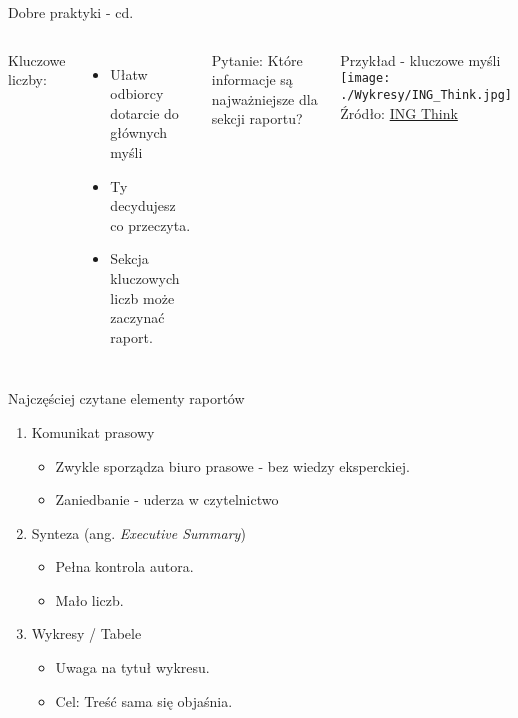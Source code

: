 \documentclass{beamer}
\begin{document}
\begin{frame}{Dobre praktyki - cd.}
	\begin{columns}[t]
		Kluczowe liczby:
		\begin{itemize}
			\item Ułatw odbiorcy dotarcie do głównych myśli
			\item Ty decydujesz co przeczyta.
			\item Sekcja kluczowych liczb może zaczynać raport.
		\end{itemize}		
		\vspace{5mm}

		Pytanie: Które informacje są najważniejsze dla sekcji raportu?

		
		\centering
		Przykład - kluczowe myśli
		\texttt{[image: ./Wykresy/ING\_Think.jpg]}
		\tiny
		Źródło: \href{https://think.ing.com/bundles/ing-monthly-the-masks-and-the-gloves-are-coming-off-economics/}{ING Think}  
	\end{columns}
\end{frame}

\begin{frame}{Najczęściej czytane elementy raportów}
	\begin{enumerate}
		\item Komunikat prasowy
		\begin{itemize}
			\item Zwykle sporządza biuro prasowe - bez wiedzy eksperckiej.
			\item Zaniedbanie - uderza w czytelnictwo
		\end{itemize}
		
		\vspace{5mm}
		\item Synteza (ang. \emph{Executive Summary})
		\begin{itemize}
			\item Pełna kontrola autora.
			\item Mało liczb.
		\end{itemize}
		
		\vspace{5mm}
		\item Wykresy / Tabele
		\begin{itemize}
			\item Uwaga na tytuł wykresu.
			\item Cel: Treść sama się objaśnia. 
		\end{itemize}			
	\end{enumerate}
\end{frame}
\end{document}
